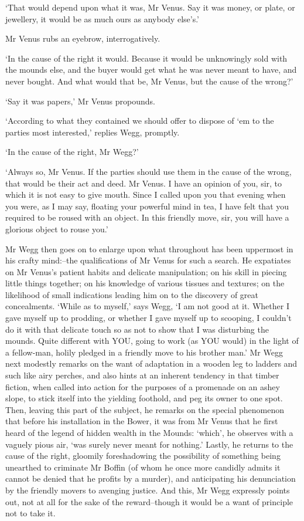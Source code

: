 ‘That would depend upon what it was, Mr Venus. Say it was money, or
plate, or jewellery, it would be as much ours as anybody else’s.’

Mr Venus rubs an eyebrow, interrogatively.

‘In the cause of the right it would. Because it would be unknowingly
sold with the mounds else, and the buyer would get what he was never
meant to have, and never bought. And what would that be, Mr Venus, but
the cause of the wrong?’

‘Say it was papers,’ Mr Venus propounds.

‘According to what they contained we should offer to dispose of ‘em to
the parties most interested,’ replies Wegg, promptly.

‘In the cause of the right, Mr Wegg?’

‘Always so, Mr Venus. If the parties should use them in the cause of the
wrong, that would be their act and deed. Mr Venus. I have an opinion of
you, sir, to which it is not easy to give mouth. Since I called upon you
that evening when you were, as I may say, floating your powerful mind in
tea, I have felt that you required to be roused with an object. In this
friendly move, sir, you will have a glorious object to rouse you.’

Mr Wegg then goes on to enlarge upon what throughout has been uppermost
in his crafty mind:--the qualifications of Mr Venus for such a search.
He expatiates on Mr Venus’s patient habits and delicate manipulation; on
his skill in piecing little things together; on his knowledge of various
tissues and textures; on the likelihood of small indications leading him
on to the discovery of great concealments. ‘While as to myself,’ says
Wegg, ‘I am not good at it. Whether I gave myself up to prodding,
or whether I gave myself up to scooping, I couldn’t do it with that
delicate touch so as not to show that I was disturbing the mounds.
Quite different with YOU, going to work (as YOU would) in the light of
a fellow-man, holily pledged in a friendly move to his brother man.’ Mr
Wegg next modestly remarks on the want of adaptation in a wooden leg
to ladders and such like airy perches, and also hints at an inherent
tendency in that timber fiction, when called into action for the
purposes of a promenade on an ashey slope, to stick itself into the
yielding foothold, and peg its owner to one spot. Then, leaving this
part of the subject, he remarks on the special phenomenon that before
his installation in the Bower, it was from Mr Venus that he first heard
of the legend of hidden wealth in the Mounds: ‘which’, he observes with
a vaguely pious air, ‘was surely never meant for nothing.’ Lastly,
he returns to the cause of the right, gloomily foreshadowing the
possibility of something being unearthed to criminate Mr Boffin (of whom
he once more candidly admits it cannot be denied that he profits by a
murder), and anticipating his denunciation by the friendly movers to
avenging justice. And this, Mr Wegg expressly points out, not at all for
the sake of the reward--though it would be a want of principle not to
take it.

